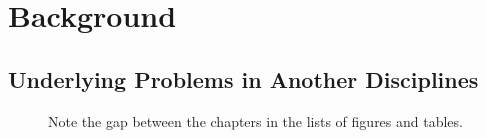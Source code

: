 \chapter{Background}\label{ch:background}


\noindent \kant[16]

\section{Underlying Problems in Another Disciplines}\label{sec:background-underlying}

\kant[17-20]

\begin{figure}[t!]
\centering
    \figbox{\rule{.1pt}{2cm} \rule[1cm]{2cm}{.1pt} \rule{.1pt}{2cm}}
	\caption[Note the gap above]{Note the gap between the chapters in the lists of figures and tables.}%
	\label{fig:background-example}%
\end{figure} 

